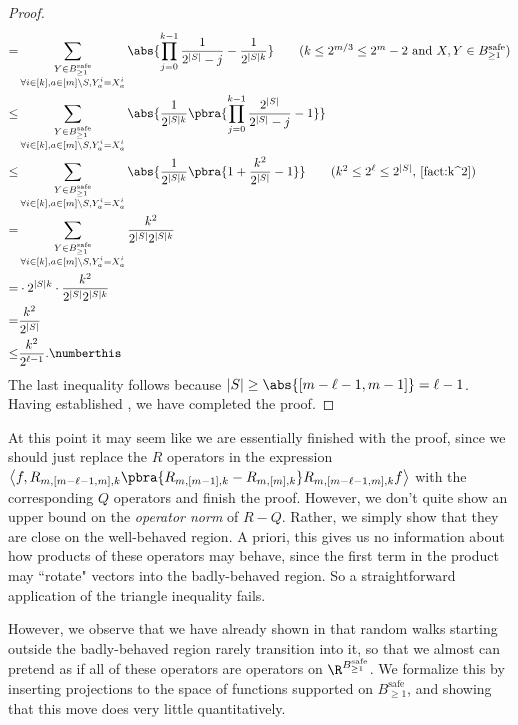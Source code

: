 \begin{proof}
\begin{align*}
    =&\sum_{\substack{Y\in B_{\geq 1}^{\mathrm{safe}}\\\forall i\in[k], a\in [m]\setminus S, Y^i_a=X^i_a}}\abs{ \prod_{j=0}^{k-1}\frac{1}{2^{|S|}-j}- \frac1{2^{|S|k}}}\tag{$k\leq 2^{m/3}\leq 2^m-2$ and $X,Y\in B_{\geq 1}^{\mathrm{safe}}$}\\
    \leq &\sum_{\substack{Y\in B_{\geq 1}^{\mathrm{safe}}\\\forall i\in[k], a\in [m]\setminus S, Y^i_a=X^i_a}}\abs{ \frac1{2^{|S|k}}\pbra{\prod_{j=0}^{k-1}\frac{2^{|S|}}{2^{|S|}-j}- 1}}\\
    \leq &\sum_{\substack{Y\in B_{\geq 1}^{\mathrm{safe}}\\\forall i\in[k], a\in [m]\setminus S, Y^i_a=X^i_a}}\abs{ \frac1{2^{|S|k}}\pbra{1+\frac{k^2}{2^{|S|}}- 1}}\tag{$k^2\leq 2^{\ell}\leq 2^{|S|}$, \Cref{fact:k^2}}\\
    = &\sum_{\substack{Y\in B_{\geq 1}^{\mathrm{safe}}\\\forall i\in[k], a\in [m]\setminus S, Y^i_a=X^i_a}}\frac{k^2}{2^{|S|}2^{|S|k}}\\
    = &\cdot 2^{|S|k}\cdot \frac{k^2}{2^{|S|}2^{|S|k}}\\
    =& \frac{k^2}{2^{|S|}}\\
    \leq& \frac{k^2}{2^{\ell-1}}.\numberthis\label{eq:tv for safe}
\end{align*}
The last inequality follows because $|S|\geq\abs{[m-\ell-1,m-1]}=\ell-1$. Having established , we have completed the proof.
\end{proof}





At this point it may seem like we are essentially finished with the proof, since we should just replace the $R$ operators in the expression $\left\langle f,{R_{m,[m-\ell-1,m],k}\pbra{R_{m,[m-1],k}-R_{m,[m],k}}}R_{m,[m-\ell-1,m],k}f\right\rangle$ with the corresponding $Q$ operators and finish the proof. However, we don't quite show an upper bound on the \textit{operator norm} of $R-Q$. Rather, we simply show that they are close on the well-behaved region. A priori, this gives us no information about how products of these operators may behave, since the first term in the product may ``rotate" vectors into the badly-behaved region. So a straightforward application of the triangle inequality fails.

However, we observe that we have already shown in  that random walks starting outside the badly-behaved region rarely transition into it, so that we almost can pretend as if all of these operators are operators on $\R^{B_{\geq1}^{\mathrm{safe}}}$. We formalize this by inserting projections to the space of functions supported on $B_{\geq1}^{\mathrm{safe}}$, and showing that this move does very little quantitatively.


